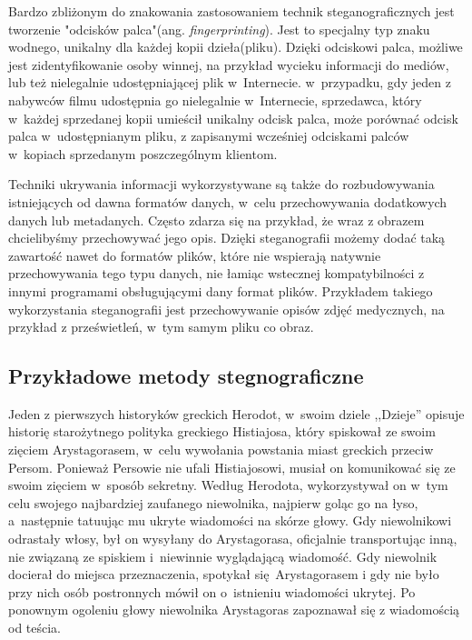 \documentclass[a4paper, twoside, 12pt]{report}
\begin{document}
        Bardzo zbliżonym do znakowania zastosowaniem technik steganograficznych jest
        tworzenie "odcisków palca"(ang. \emph{fingerprinting}). Jest to specjalny
        typ znaku wodnego, unikalny dla każdej kopii dzieła(pliku). Dzięki odciskowi
        palca, możliwe jest zidentyfikowanie osoby winnej, na przykład wycieku informacji
        do mediów, lub też nielegalnie udostępniającej plik w~Internecie. w~przypadku,
        gdy jeden z nabywców filmu udostępnia go nielegalnie w~Internecie, sprzedawca,
        który w~każdej sprzedanej kopii umieścił unikalny odcisk palca, może porównać
        odcisk palca w~udostępnianym pliku, z zapisanymi wcześniej odciskami palców
        w~kopiach sprzedanym poszczególnym klientom.

        Techniki ukrywania informacji wykorzystywane są także do rozbudowywania
        istniejących od dawna formatów danych, w~celu przechowywania dodatkowych
        danych lub metadanych. Często zdarza się na przykład, że wraz z obrazem
        chcielibyśmy przechowywać jego opis. Dzięki steganografii możemy dodać
        taką zawartość nawet do formatów plików, które nie wspierają natywnie
        przechowywania tego typu danych, nie łamiąc wstecznej kompatybilności z innymi
        programami obsługującymi dany format plików. Przykładem takiego wykorzystania
        steganografii jest przechowywanie opisów zdjęć medycznych, na przykład
        z prześwietleń, w~tym samym pliku co obraz.\cite{DISAPPEARINGCRYPTOEMBEDDINGMETDATA}

        \subsection{Przykładowe metody stegnograficzne}
        Jeden z pierwszych historyków greckich Herodot, w~swoim dziele ,,Dzieje''
        opisuje historię starożytnego polityka greckiego Histiajosa, który spiskował
        ze swoim zięciem Arystagorasem, w~celu wywołania powstania miast greckich
        przeciw Persom\cite{STEGANOGRAPHYINTRO}. Ponieważ Persowie nie ufali Histiajosowi, musiał on komunikować
        się ze swoim zięciem w~sposób sekretny. Według Herodota, wykorzystywał
        on w~tym celu swojego najbardziej zaufanego niewolnika, najpierw goląc
        go na łyso, a~następnie tatuując mu ukryte wiadomości na skórze głowy.
        Gdy niewolnikowi odrastały włosy, był on wysyłany do Arystagorasa, oficjalnie
        transportując inną, nie związaną ze spiskiem i~niewinnie wyglądającą wiadomość.
        Gdy niewolnik docierał do miejsca przeznaczenia, spotykał się Arystagorasem i
        gdy nie było przy nich osób postronnych mówił on o~istnieniu wiadomości ukrytej.
        Po ponownym ogoleniu głowy niewolnika Arystagoras zapoznawał się z wiadomością
        od teścia.
\end{document}
